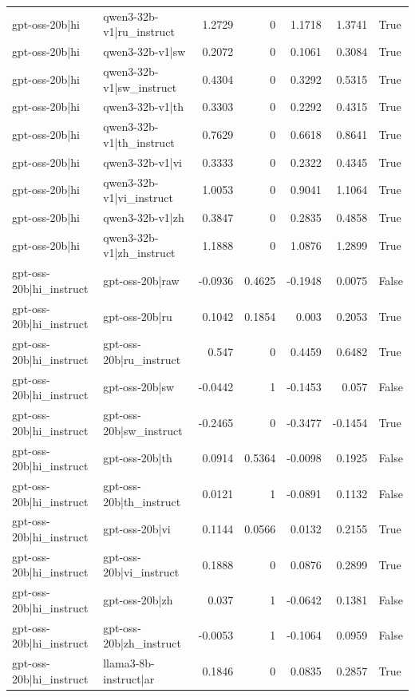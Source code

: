 \begin{table}
\begin{tabular}{l l r r r r l}
gpt-oss-20b|hi & qwen3-32b-v1|ru_instruct & 1.2729 & 0 & 1.1718 & 1.3741 & True \\
gpt-oss-20b|hi & qwen3-32b-v1|sw & 0.2072 & 0 & 0.1061 & 0.3084 & True \\
gpt-oss-20b|hi & qwen3-32b-v1|sw_instruct & 0.4304 & 0 & 0.3292 & 0.5315 & True \\
gpt-oss-20b|hi & qwen3-32b-v1|th & 0.3303 & 0 & 0.2292 & 0.4315 & True \\
gpt-oss-20b|hi & qwen3-32b-v1|th_instruct & 0.7629 & 0 & 0.6618 & 0.8641 & True \\
gpt-oss-20b|hi & qwen3-32b-v1|vi & 0.3333 & 0 & 0.2322 & 0.4345 & True \\
gpt-oss-20b|hi & qwen3-32b-v1|vi_instruct & 1.0053 & 0 & 0.9041 & 1.1064 & True \\
gpt-oss-20b|hi & qwen3-32b-v1|zh & 0.3847 & 0 & 0.2835 & 0.4858 & True \\
gpt-oss-20b|hi & qwen3-32b-v1|zh_instruct & 1.1888 & 0 & 1.0876 & 1.2899 & True \\
gpt-oss-20b|hi_instruct & gpt-oss-20b|raw & -0.0936 & 0.4625 & -0.1948 & 0.0075 & False \\
gpt-oss-20b|hi_instruct & gpt-oss-20b|ru & 0.1042 & 0.1854 & 0.003 & 0.2053 & True \\
gpt-oss-20b|hi_instruct & gpt-oss-20b|ru_instruct & 0.547 & 0 & 0.4459 & 0.6482 & True \\
gpt-oss-20b|hi_instruct & gpt-oss-20b|sw & -0.0442 & 1 & -0.1453 & 0.057 & False \\
gpt-oss-20b|hi_instruct & gpt-oss-20b|sw_instruct & -0.2465 & 0 & -0.3477 & -0.1454 & True \\
gpt-oss-20b|hi_instruct & gpt-oss-20b|th & 0.0914 & 0.5364 & -0.0098 & 0.1925 & False \\
gpt-oss-20b|hi_instruct & gpt-oss-20b|th_instruct & 0.0121 & 1 & -0.0891 & 0.1132 & False \\
gpt-oss-20b|hi_instruct & gpt-oss-20b|vi & 0.1144 & 0.0566 & 0.0132 & 0.2155 & True \\
gpt-oss-20b|hi_instruct & gpt-oss-20b|vi_instruct & 0.1888 & 0 & 0.0876 & 0.2899 & True \\
gpt-oss-20b|hi_instruct & gpt-oss-20b|zh & 0.037 & 1 & -0.0642 & 0.1381 & False \\
gpt-oss-20b|hi_instruct & gpt-oss-20b|zh_instruct & -0.0053 & 1 & -0.1064 & 0.0959 & False \\
gpt-oss-20b|hi_instruct & llama3-8b-instruct|ar & 0.1846 & 0 & 0.0835 & 0.2857 & True \\

\end{tabular}
\end{table}
